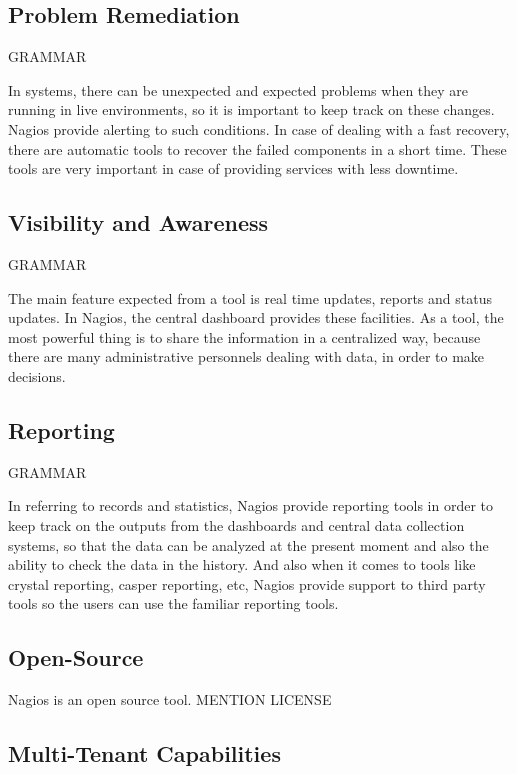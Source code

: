 \documentclass[9pt,twocolumn,twoside]{styles/osajnl}
\begin{document}
\subsection{Problem Remediation}

GRAMMAR

In systems, there can be unexpected and expected problems when they
are running in live environments, so it is important to keep track on
these changes. Nagios provide alerting to such conditions. In case of
dealing with a fast recovery, there are automatic tools to recover the
failed components in a short time. These tools are very important in
case of providing services with less downtime.

\subsection{Visibility and Awareness}

GRAMMAR

The main feature expected from a tool is real time updates, reports
and status updates. In Nagios, the central dashboard provides these
facilities. As a tool, the most powerful thing is to share the
information in a centralized way, because there are many
administrative personnels dealing with data, in order to make
decisions.

\subsection{Reporting}

GRAMMAR

In referring to records and statistics, Nagios provide reporting tools
in order to keep track on the outputs from the dashboards and central
data collection systems, so that the data can be analyzed at the
present moment and also the ability to check the data in the history.
And also when it comes to tools like crystal reporting, casper
reporting, etc, Nagios provide support to third party tools so the
users can use the familiar reporting tools.

\subsection{Open-Source}

Nagios is an open source tool. MENTION LICENSE

\subsection{Multi-Tenant Capabilities}
\end{document}
